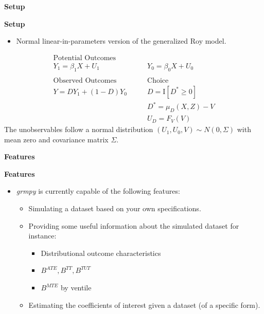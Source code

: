 \begin{frame}\begin{center}
\LARGE\textbf{Setup}
\end{center}\end{frame}



\begin{frame}
\textbf{Setup}

\medskip
\begin{itemize}\setlength\itemsep{1em}
\item Normal linear-in-parameters version of the generalized Roy model.
\end{itemize}
\begin{align*}
\text{Potential Outcomes} &\qquad \\
Y_1 = \beta_1 X + U_1      &\qquad Y_0 = \beta_0 X + U_0 \\
    & \\
\text{Observed Outcomes}  &\qquad \text{Choice} \\
Y = D Y_1 + (1 - D)Y_0 &\qquad D = \mathrm{I}[D^{*} \geq 0] \\
                       &\qquad D^{*} = \mu_D(X, Z) - V \\
                       &\qquad U_D = F_V(V)
\end{align*}
The unobservables follow a normal distribution $(U_1, U_0, V) \sim N(0, \Sigma)$ with mean zero and covariance matrix $\Sigma$. 
\end{frame}

\begin{frame}\begin{center}
\LARGE\textbf{Features}
\end{center}\end{frame}

\begin{frame}
\textbf{Features}

\medskip
\begin{itemize}\setlength\itemsep{1em}
\item \textit{grmpy} is currently capable of the following features:
\begin{itemize}\setlength\itemsep{1em}
  \item Simulating a dataset based on your own specifications.
  \item Providing some useful information about the simulated dataset for instance:
  
  \medskip
    \begin{itemize}\setlength\itemsep{1em}
    \item Distributional outcome characteristics
    \item $B^{ATE}, B^{TT}, B^{TUT}$
    \item $B^{MTE}$ by ventile
    \end{itemize}
  \item Estimating the coefficients of interest given a dataset (of a specific form).
\end{itemize}
\end{itemize}

\end{frame}


